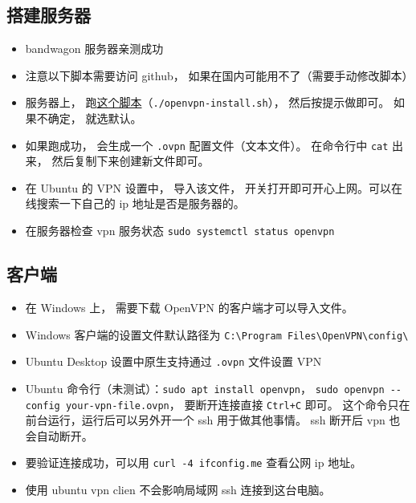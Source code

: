 
\begin{issues}
\issueDraft
\end{issues}

\subsection{搭建服务器}
\begin{itemize}
\item bandwagon 服务器亲测成功
\item 注意以下脚本需要访问 github， 如果在国内可能用不了（需要手动修改脚本）
\item 服务器上， 跑\href{https://github.com/MacroUniverse/openvpn-install/blob/master/openvpn-install.sh}{这个脚本}（\verb`./openvpn-install.sh`）， 然后按提示做即可。 如果不确定， 就选默认。
\item 如果跑成功， 会生成一个 \verb`.ovpn` 配置文件（文本文件）。 在命令行中 \verb`cat` 出来， 然后复制下来创建新文件即可。
\item 在 Ubuntu 的 VPN 设置中， 导入该文件， 开关打开即可开心上网。可以在线搜索一下自己的 ip 地址是否是服务器的。
\item 在服务器检查 vpn 服务状态 \verb`sudo systemctl status openvpn`
\end{itemize}

\subsection{客户端}
\begin{itemize}
\item 在 Windows 上， 需要下载 OpenVPN 的客户端才可以导入文件。
\item Windows 客户端的设置文件默认路径为 \verb`C:\Program Files\OpenVPN\config\`
\item Ubuntu Desktop 设置中原生支持通过 \verb`.ovpn` 文件设置 VPN
\item Ubuntu 命令行（未测试）：\verb`sudo apt install openvpn`， \verb`sudo openvpn --config your-vpn-file.ovpn`， 要断开连接直接 \verb`Ctrl+C` 即可。 这个命令只在前台运行，运行后可以另外开一个 ssh 用于做其他事情。 ssh 断开后 vpn 也会自动断开。
\item 要验证连接成功，可以用 \verb`curl -4 ifconfig.me` 查看公网 ip 地址。
\item 使用 ubuntu vpn clien 不会影响局域网 ssh 连接到这台电脑。
\end{itemize}
